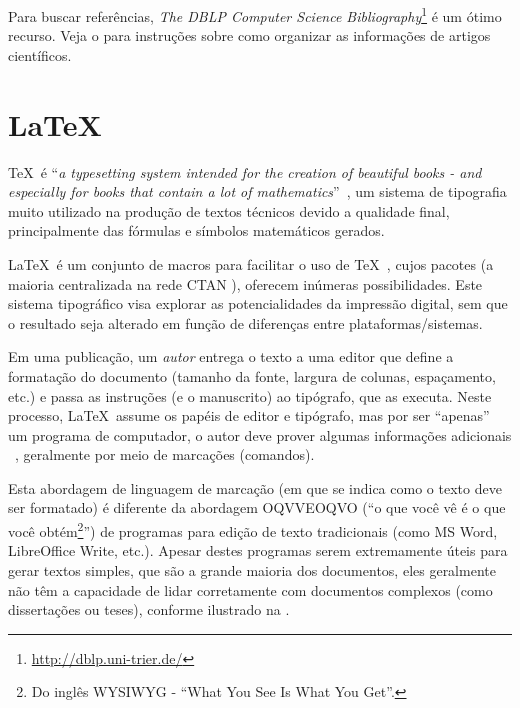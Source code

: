 Para buscar referências, \emph{The DBLP Computer Science Bibliography}\footnote{\url{http://dblp.uni-trier.de/}}
é um ótimo recurso. Veja o  para instruções sobre
	como organizar as informações de artigos científicos.



\section{\LaTeX}%

\TeX\ é ``\emph{a typesetting system intended for the creation of beautiful books
 - and especially for books that contain a lot of mathematics}''~\cite{Knuth_1986_texbook},
 um sistema de tipografia muito utilizado na produção de textos técnicos devido
 a qualidade final, principalmente das fórmulas e símbolos matemáticos gerados.

\LaTeX\ é um conjunto de macros para facilitar o uso de \TeX~\cite{lamport_latex:_1994,},
cujos pacotes (a maioria centralizada na rede \acrshort{CTAN} \cite{greenwade93}), oferecem
inúmeras possibilidades. Este sistema tipográfico visa explorar as potencialidades
da impressão digital, sem que o resultado seja alterado em função de diferenças
entre plataformas/sistemas.

Em uma publicação, um \emph{autor} entrega o texto a uma editor que define a
formatação do documento (tamanho da fonte, largura de colunas, espaçamento, etc.)
e passa as instruções (e o manuscrito) ao tipógrafo, que as executa. Neste processo,
\LaTeX\ assume os papéis de editor e tipógrafo, mas por ser ``apenas'' um programa
de computador, o autor deve prover algumas informações adicionais ~\cite{Oetiker_1995_notsoshort},
geralmente por meio de marcações (comandos).

Esta abordagem de linguagem de marcação (em que se indica como o texto deve ser
formatado) é diferente da abordagem OQVVEOQVO (``o que você vê é o que você
obtém\footnote{Do inglês WYSIWYG - ``What You See Is What You Get''.}'') de programas
para edição de texto tradicionais (como MS Word, LibreOffice Write, etc.).
Apesar destes programas serem extremamente úteis para gerar textos simples, que
são a grande maioria dos documentos, eles geralmente não têm a capacidade de lidar
corretamente com documentos complexos (como dissertações ou teses), conforme ilustrado
na .

